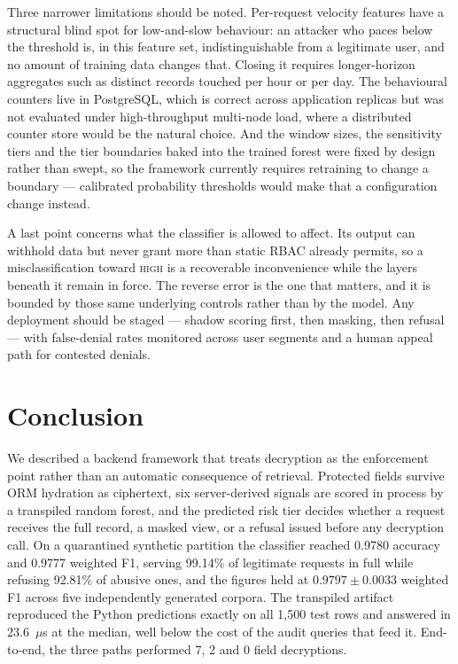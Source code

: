 \documentclass[a4paper,conference]{IEEEtran}
\newcommand{\HIGH}{\textsc{high}}
\begin{document}
Three narrower limitations should be noted. Per-request velocity features have a structural blind
spot for low-and-slow behaviour: an attacker who paces below the threshold is, in this feature
set, indistinguishable from a legitimate user, and no amount of training data changes that.
Closing it requires longer-horizon aggregates such as distinct records touched per hour or per
day. The behavioural counters live in
PostgreSQL, which is correct across application replicas but was not evaluated under
high-throughput multi-node load, where a distributed counter store would be the natural choice.
And the window sizes, the sensitivity tiers and the tier boundaries baked into the trained forest
were fixed by design rather than swept, so the framework currently requires retraining to change
a boundary --- calibrated probability thresholds would make that a configuration change instead.

A last point concerns what the classifier is allowed to affect. Its output can withhold data but
never grant more than static RBAC already permits, so a misclassification toward \HIGH{} is a
recoverable inconvenience while the layers beneath it remain in force. The reverse error is the
one that matters, and it is bounded by those same underlying controls rather than by the model.
Any deployment should be staged --- shadow scoring first, then masking, then refusal --- with
false-denial rates monitored across user segments and a human appeal path for contested denials.

\section{Conclusion}

We described a backend framework that treats decryption as the enforcement point rather than an
automatic consequence of retrieval. Protected fields survive ORM hydration as ciphertext, six
server-derived signals are scored in process by a transpiled random forest, and the predicted
risk tier decides whether a request receives the full record, a masked view, or a refusal issued
before any decryption call. On a quarantined synthetic partition the classifier reached 0.9780
accuracy and 0.9777 weighted F1, serving 99.14\% of legitimate requests in full while refusing
92.81\% of abusive ones, and the figures held at $0.9797 \pm 0.0033$ weighted F1 across five
independently generated corpora. The transpiled artifact reproduced the Python predictions
exactly on all 1{,}500 test rows and answered in 23.6~$\mu$s at the median, well below the cost
of the audit queries that feed it. End-to-end, the three paths performed 7, 2 and 0 field
decryptions.
\end{document}
